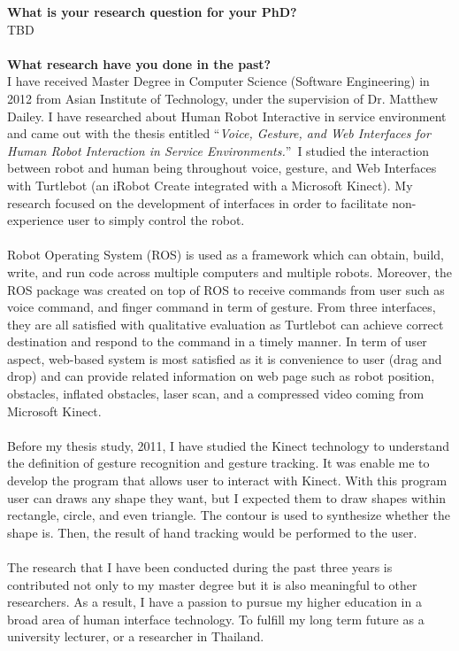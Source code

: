 \documentclass[12pt,a4paper,roman]{moderncv}        %
\begin{document}
\makecvtitle
\textbf{What is your research question for your PhD?}
\\
TBD
\\
\\
\textbf{What research have you done in the past?}
\\
I have received Master Degree in Computer Science (Software Engineering) in 2012 from Asian Institute of Technology, under the supervision of Dr. Matthew Dailey. I have researched about Human Robot Interactive in service environment and came out with the thesis entitled ``\emph{Voice, Gesture, and Web Interfaces for Human Robot Interaction in Service Environments.}''\ I studied the interaction between robot and human being throughout voice, gesture, and Web Interfaces with Turtlebot (an iRobot Create integrated with a Microsoft Kinect). My research focused on the development of interfaces in order to facilitate non-experience user to simply control the robot. 
\\
\\
Robot Operating System (ROS) is used as a framework which can obtain, build, write, and run code across multiple computers and multiple robots. Moreover, the ROS package was created on top of ROS to receive commands from user such as voice command, and finger command in term of gesture. From three interfaces, they are all satisfied with qualitative evaluation as Turtlebot can achieve correct destination and respond to the command in a timely manner. In term of user aspect, web-based system is most satisfied as it is convenience to user (drag and drop) and can provide related information on web page such as robot position, obstacles, inflated obstacles, laser scan, and a compressed video coming from Microsoft Kinect.
\\
\\
Before my thesis study, 2011, I have studied the Kinect technology to understand the definition of gesture recognition and gesture tracking. It was enable me to develop the program that allows user to interact with Kinect. With this program user can draws any shape they want, but I expected them to draw shapes within rectangle, circle, and even triangle. The contour is used to synthesize whether the shape is. Then, the result of hand tracking would be performed to the user. 
\\
\\
The research that I have been conducted during the past three years is contributed not only to my master degree but it is also meaningful to other researchers. As a result, I have a passion to pursue my higher education in a broad area of human interface technology. To fulfill my long term future as a university lecturer, or a researcher in Thailand. 
		
\end{document}
